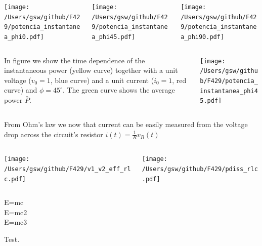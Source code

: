 \begin{frame}
\begin{columns}
	\begin{column}{0.33\textwidth}		
	\texttt{[image: /Users/gsw/github/F429/potencia\_instantanea\_phi0.pdf]}
	\end{column}
	\pause
	\begin{column}{0.33\textwidth}
	\texttt{[image: /Users/gsw/github/F429/potencia\_instantanea\_phi45.pdf]}
	\end{column}
	\pause
	\begin{column}{0.33\textwidth}
	\texttt{[image: /Users/gsw/github/F429/potencia\_instantanea\_phi90.pdf]}
	\end{column}
\end{columns}

\pause
	\begin{columns}
		\begin{column}{0.5\textwidth}
		In figure we show the time dependence of the instantaneous power (yellow curve) together with a unit voltage 	($v_0=1$, blue curve) and a unit current ($i_0=1$, red curve) and $\phi=45^{\circ}$. The green curve shows the 	average power $\bar{P}$. 
		\end{column}
		\begin{column}{0.5\textwidth}
			\texttt{[image: /Users/gsw/github/F429/potencia\_instantanea\_phi45.pdf]}
		\end{column}
	\end{columns}
From Ohm's law we now that current can be easily measured from the voltage drop across the circuit's resistor $i(t)=\frac{1}{R}v_R(t)$
\end{frame}
\begin{frame}
	\begin{columns}
		\begin{column}{0.5\textwidth}
			\texttt{[image: /Users/gsw/github/F429/v1\_v2\_eff\_rlc.pdf]}
		\end{column}
		\begin{column}{0.5\textwidth}
			\texttt{[image: /Users/gsw/github/F429/pdiss\_rlc.pdf]}
		\end{column}
	\end{columns}
\pause
    E=mc\\
    \pause
    E=mc2\\
    \pause
    E=mc3\\
\end{frame}



\begin{frame}[label=supplementary1]
Test\hyperlink{two-port}{}.
\end{frame}

